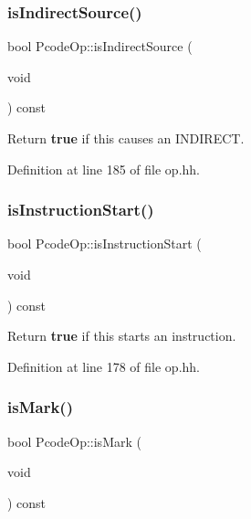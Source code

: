\subsubsection{\texorpdfstring{isIndirectSource()}{isIndirectSource()}}
{\footnotesize\ttfamily bool Pcode\+Op\+::is\+Indirect\+Source (\begin{DoxyParamCaption}\item[{void}]{ }\end{DoxyParamCaption}) const\hspace{0.3cm}{\ttfamily [inline]}}



Return {\bfseries{true}} if this causes an I\+N\+D\+I\+R\+E\+CT. 



Definition at line 185 of file op.\+hh.

\mbox{\label{class_pcode_op_a9dd35f409dc0f1e1100c2654b92d51af}} 
\subsubsection{\texorpdfstring{isInstructionStart()}{isInstructionStart()}}
{\footnotesize\ttfamily bool Pcode\+Op\+::is\+Instruction\+Start (\begin{DoxyParamCaption}\item[{void}]{ }\end{DoxyParamCaption}) const\hspace{0.3cm}{\ttfamily [inline]}}



Return {\bfseries{true}} if this starts an instruction. 



Definition at line 178 of file op.\+hh.

\mbox{\label{class_pcode_op_a4b101f4003977788f722635bd987c4eb}} 
\subsubsection{\texorpdfstring{isMark()}{isMark()}}
{\footnotesize\ttfamily bool Pcode\+Op\+::is\+Mark (\begin{DoxyParamCaption}\item[{void}]{ }\end{DoxyParamCaption}) const\hspace{0.3cm}{\ttfamily [inline]}}



